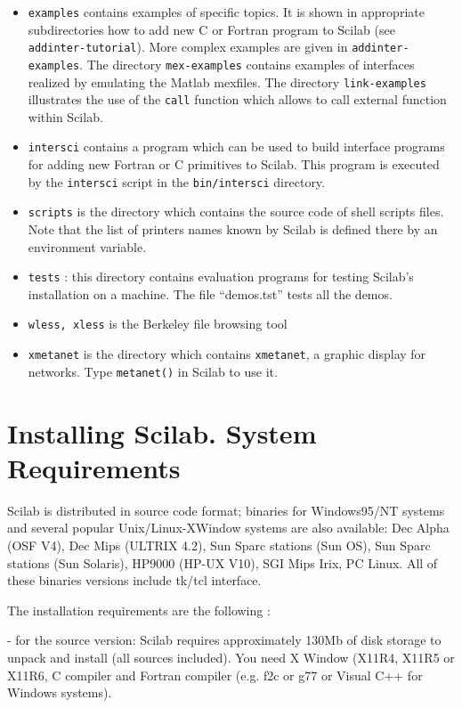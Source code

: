 \begin{itemize}
\item{{\tt examples} contains examples of specific topics. It is shown
in appropriate subdirectories how to add new C or Fortran program
to Scilab (see \verb!addinter-tutorial!). More complex examples are given
in \verb!addinter-examples!. The directory \verb!mex-examples!
contains examples of interfaces realized by emulating the Matlab
mexfiles. The directory \verb!link-examples! illustrates the use of
the \verb!call! function which allows to call external function within
Scilab.}

\item{{\tt intersci} contains a program which can be used to build
interface programs for adding new Fortran or C 
primitives to Scilab. This program is executed by the {\tt intersci}
script in the {\tt bin/intersci} directory.}

\item{{\tt scripts} is the directory which contains the source code of 
shell scripts files. Note that the list of printers  
names known by Scilab is defined there by an environment variable.}

\item{{\tt tests} : this directory contains evaluation programs for testing 
Scilab's installation on a machine. The file ``demos.tst'' tests all the 
demos.}

\item{{\tt wless, xless} is the Berkeley file browsing tool}

\item{{\tt xmetanet} is the directory which contains {\tt xmetanet}, a 
graphic display for networks. Type {\tt metanet()} in Scilab to use it.}

\end{itemize}

\section{Installing Scilab. System Requirements}
\label{install}
Scilab is distributed in source code format; binaries for Windows95/NT
systems and several popular Unix/Linux-XWindow systems are also
available: Dec Alpha (OSF V4), Dec Mips (ULTRIX 4.2), Sun Sparc
stations (Sun OS), Sun Sparc stations (Sun Solaris), HP9000 (HP-UX
V10), SGI Mips Irix, PC Linux. All of these binaries versions include
tk/tcl interface.

The installation requirements are the following :

- for the source version: Scilab requires approximately 130Mb of disk
storage to unpack and install (all sources included).  You need X
Window (X11R4, X11R5 or X11R6, C compiler and Fortran compiler
(e.g. f2c or g77 or Visual C++ for Windows systems). 
  
